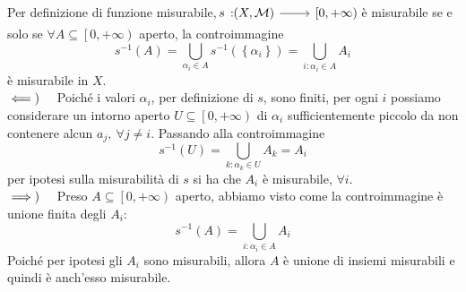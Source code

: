 \begin{demonstration}~{}\\
	Per definizione di funzione misurabile, $\funz{s}{\left(X,\mathcal{M}\right)}{\left[0,+\infty\right)}$ è misurabile se e solo se $\forall A\subseteq\left[0,+\infty\right)$ aperto, la controimmagine
	\begin{equation*}
		s^{-1}\left(A\right)=\bigcup_{\alpha_i\in A}s^{-1}\left(\left\{\alpha_i\right\}\right)=\bigcup_{i\colon \alpha_i\in A}A_i
	\end{equation*}
è misurabile in $X$.\\
$\impliedby)\quad$ Poiché i valori $\alpha_i$, per definizione di $s$, sono finiti, per ogni $i$ possiamo considerare un intorno aperto $U\subseteq \left[0,+\infty\right)$ di $\alpha_i$ sufficientemente piccolo da non contenere alcun $a_j,\ \forall j\neq i$. Passando alla controimmagine
\begin{equation*}
	s^{-1}\left(U\right)=\bigcup_{k\colon \alpha_k\in U}A_k=A_i
\end{equation*}
per ipotesi sulla misurabilità di $s$ si ha che $A_i$ è misurabile, $\forall i$.\\
$\implies)\quad$ Preso $A\subseteq\left[0,+\infty\right)$ aperto, abbiamo visto come la controimmagine è unione finita degli $A_i$:
	\begin{equation*}
	s^{-1}\left(A\right)=\bigcup_{i\colon \alpha_i\in A}A_i
\end{equation*}
Poiché per ipotesi gli $A_i$ sono misurabili, allora $A$ è unione di insiemi misurabili e quindi è anch'esso misurabile.
\end{demonstration}
